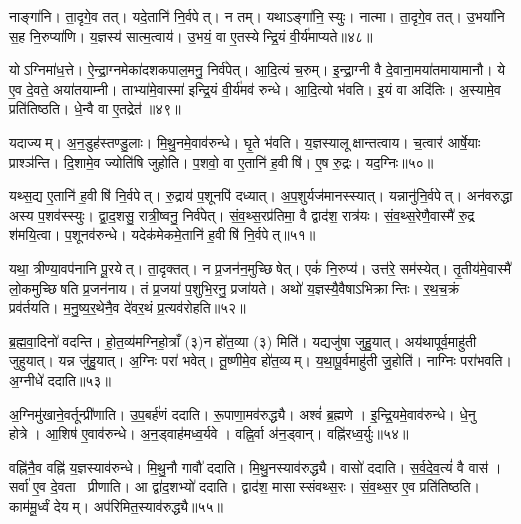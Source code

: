 नाङ्गा॑नि। ता॒दृगे॒व तत्। यदे॒तानि॑ नि॒र्वपेत्। न तम्। यथाऽङ्गा॑नि॒ स्युः। नात्मा। ता॒दृगे॒व तत्। उ॒भया॑नि स॒ह नि॒रुप्या॑णि। य॒ज्ञस्य॑ सात्म॒त्वाय॑। उ॒भयं॒ वा ए॒तस्येन्द्रि॒यं वी॒र्य॑माप्यते॥४८॥

योऽग्निमा॑ध॒त्ते। ऐ॒न्द्रा॒ग्नमेका॑दशकपाल॒मनु॒ निर्व॑पेत्। आ॒दि॒त्यं च॒रुम्। इ॒न्द्रा॒ग्नी वै दे॒वाना॒मया॑तमायामानौ। ये ए॒व दे॒वते॒ अया॑तयाम्नी। ताभ्या॑मे॒वास्मा॑ इन्द्रि॒यं वी॒र्य॑मव॑ रुन्धे। आ॒दि॒त्यो भ॑वति। इ॒यं वा अदि॑तिः। अ॒स्यामे॒व प्रति॑तिष्ठति। धे॒न्वै वा ए॒तद्रेत॑॥४९॥

यदाज्यम्। अ॒न॒डुह॑स्तण्डु॒लाः। मि॒थु॒नमे॒वाव॑रुन्धे। घृ॒ते भ॑वति। य॒ज्ञस्यालूक्षान्तत्वाय। च॒त्वार॑ आर्\mbox{}षे॒याः प्राश्ञ॑न्ति। दि॒शामे॒व ज्योति॑षि जुहोति। प॒शवो॒ वा ए॒तानि॑ ह॒वीषि॑। ए॒ष रु॒द्रः। यद॒ग्निः॥५०॥

यथ्स॒द्य ए॒तानि॑ ह॒वीषि॑ नि॒र्वपेत्। रु॒द्राय॑ प॒शूनपि॑ दध्यात्। अ॒प॒शुर्यज॑मानस्स्यात्। यन्नानु॑नि॒र्वपेत्। अन॑वरुद्धा अस्य प॒शव॑स्स्युः। द्वा॒द॒शसु॒ रात्री॒ष्वनु॒ निर्व॑पेत्। सं॒व॒थ्स॒रप्र॑तिमा॒ वै द्वाद॑श॒ रात्र॑यः। सं॒व॒थ्स॒रेणै॒वास्मै॑ रु॒द्र श॑मयि॒त्वा। प॒शूनव॑रुन्धे। यदेक॑मेकमे॒तानि॑ ह॒वीषि॑ नि॒र्वपेत्॥५१॥

यथा॒ त्रीण्या॒वप॑नानि पू॒रयेत्। ता॒दृक्तत्। न प्र॒जन॑न॒मुच्छिषेत्। एकं॑ नि॒रुप्य॑। उत्त॑रे॒ सम॑स्येत्। तृ॒तीय॑मे॒वास्मै॑ लो॒कमुच्छिषति प्र॒जन॑नाय। तं प्र॒जया॑ प॒शुभि॒रनु॒ प्रजा॑यते। अथो॑ य॒ज्ञस्यै॒वैषाऽभिक्रान्तिः। र॒थ॒च॒क्रं प्रव॑र्तयति। म॒नु॒ष्य॒र॒थेनै॒व दे॑वर॒थं प्र॒त्यव॑रोहति॥५२॥

ब्र॒ह्म॒वा॒दिनो॑ वदन्ति। हो॒त॒व्य॑मग्निहो॒त्राँ (३)न हो॑त॒व्या (३) मिति॑। यद्यजु॑षा जुहु॒यात्। अय॑थापूर्व॒माहु॑ती जुहुयात्। यन्न जु॑हु॒यात्। अ॒ग्निः परा॑ भवेत्। तू॒ष्णीमे॒व हो॑त॒व्यम्। य॒था॒पू॒र्वमाहु॑ती जु॒होति॑। नाग्निः परा॑भवति। अ॒ग्नीधे॑ ददाति॥५३॥

अ॒ग्निमु॑खाने॒वर्तून्प्री॑णाति। उ॒प॒बर्\mbox{}ह॑णं ददाति। रू॒पाणा॒मव॑रुद्ध्यै। अश्वं॑ ब्र॒ह्मणे। इ॒न्द्रि॒यमे॒वाव॑रुन्धे। धे॒नु होत्रे। आ॒शिष॑ ए॒वाव॑रुन्धे। अ॒न॒ड्वाह॑मध्व॒र्यवे। वह्नि॒र्वा अ॑न॒ड्वान्। वह्नि॑रध्व॒र्युः॥५४॥

वह्नि॑नै॒व वह्नि॑ य॒ज्ञस्याव॑रुन्धे। मि॒थु॒नौ गावौ॑ ददाति। मि॒थु॒नस्याव॑रुद्ध्यै। वासो॑ ददाति। स॒र्व॒दे॒व॒त्यं॑ वै वास॑। सर्वा॑ ए॒व दे॒वता प्रीणाति। आ द्वा॑द॒शभ्यो॑ ददाति। द्वाद॑श॒ मासास्संवथ्स॒रः। सं॒व॒थ्स॒र ए॒व प्रति॑तिष्ठति। काम॑मू॒र्ध्वं देयम्। अप॑रिमित॒स्याव॑रुद्ध्यै॥५५॥\anuvakamend[आ॒दि॒त्ये तृती॑यम॒फ्स्वासी॒त्तत्तेनावा॑रुन्धत॒ स्यादाप्यते॒ रेतो॒ऽग्निरेक॑मेकमे॒तानि॑ ह॒वीषि॑ नि॒र्वपेत्प्र॒त्यव॑रोहति ददात्यध्व॒र्युर्देय॒मेकं॑ च]


